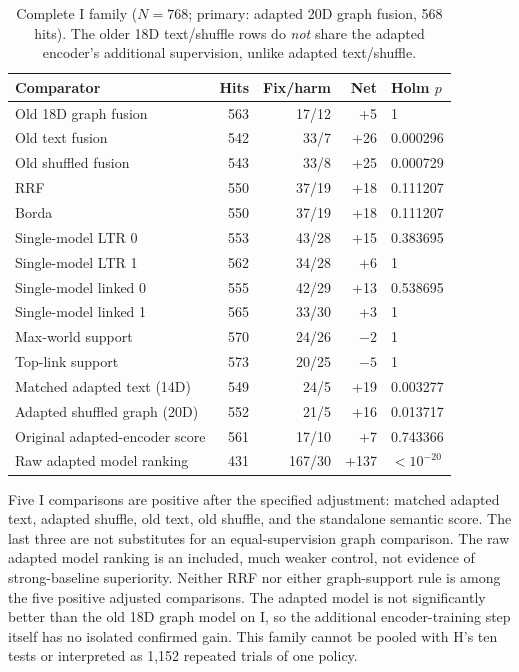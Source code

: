 \begin{table}[h]
\centering
\caption{Complete I family ($N=768$; primary: adapted 20D graph fusion,
568 hits). The older 18D text/shuffle rows do \emph{not} share the adapted
encoder's additional supervision, unlike adapted text/shuffle.}
\label{tab:fulli}\small
\begin{tabular}{lrrrl}
\toprule
Comparator & Hits & Fix/harm & Net & Holm $p$ \\
\midrule
Old 18D graph fusion & 563 & 17/12 & +5 & 1 \\
Old text fusion & 542 & 33/7 & +26 & 0.000296 \\
Old shuffled fusion & 543 & 33/8 & +25 & 0.000729 \\
RRF & 550 & 37/19 & +18 & 0.111207 \\
Borda & 550 & 37/19 & +18 & 0.111207 \\
Single-model LTR 0 & 553 & 43/28 & +15 & 0.383695 \\
Single-model LTR 1 & 562 & 34/28 & +6 & 1 \\
Single-model linked 0 & 555 & 42/29 & +13 & 0.538695 \\
Single-model linked 1 & 565 & 33/30 & +3 & 1 \\
Max-world support & 570 & 24/26 & $-2$ & 1 \\
Top-link support & 573 & 20/25 & $-5$ & 1 \\
Matched adapted text (14D) & 549 & 24/5 & +19 & 0.003277 \\
Adapted shuffled graph (20D) & 552 & 21/5 & +16 & 0.013717 \\
Original adapted-encoder score & 561 & 17/10 & +7 & 0.743366 \\
Raw adapted model ranking & 431 & 167/30 & +137 & $<10^{-20}$ \\
\bottomrule
\end{tabular}
\end{table}

Five I comparisons are positive after the specified adjustment: matched
adapted text, adapted shuffle, old text, old shuffle, and the standalone
semantic score. The last three are not substitutes for an equal-supervision
graph comparison. The raw adapted model ranking is an included, much
weaker control, not evidence of strong-baseline superiority. Neither RRF
nor either graph-support rule is among the five positive adjusted
comparisons. The adapted model is not significantly better than the
old 18D graph model on I, so the additional encoder-training step itself
has no isolated confirmed gain. This family cannot be pooled with H's
ten tests or interpreted as 1,152 repeated trials of one policy.

